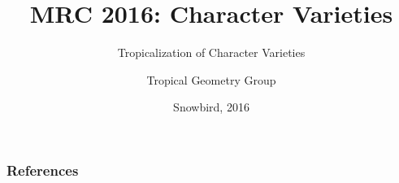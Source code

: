 \documentclass{beamer}
\begin{document}
\title[Tropicalization of Character Varieties]
{MRC 2016: Character Varieties}
\subtitle{Tropicalization of Character Varieties}
\author[TGG]{Tropical Geometry Group}
\date[Snowbird 2016] %
{Snowbird, 2016}
\subject{character varieties, tropical geometry}
\frame{\titlepage}




% 
% 
% 

\begin{frame}[allowframebreaks]
  \frametitle{References}
  \cite{*}%
\end{frame}
\end{document}
